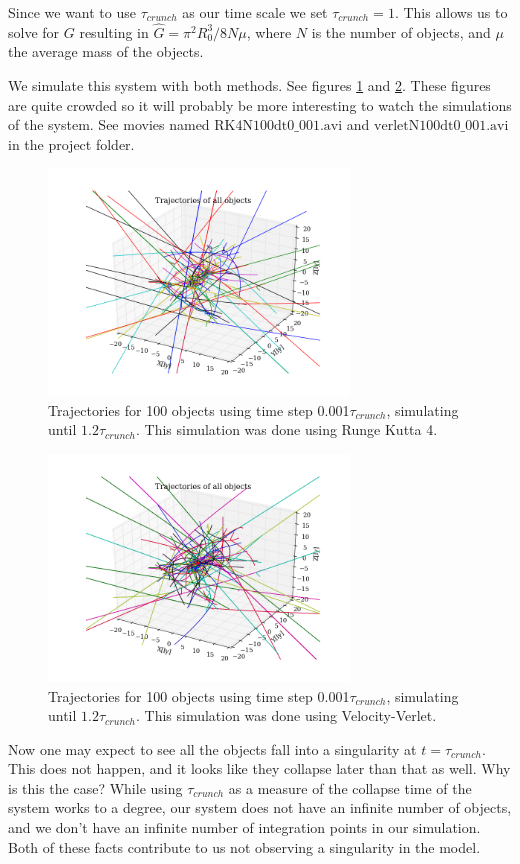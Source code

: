 \documentclass{aa}   %
\begin{document}
Since we want to use $\tau_{crunch}$ as our time scale we set $\tau_{crunch} = 1$. This allows us to solve for $G$ resulting in 
$\hat G = \pi^2 R_0^3/8N\mu$, where $N$ is the number of objects, and $\mu$ the average mass of the objects. 

We simulate this system with both methods. See figures \ref{RK4N100dt0_001} and \ref{verletN100dt0_001}. These figures are quite crowded so it will probably be more interesting to watch the simulations of the system. See movies named 
$\mathrm{RK4N100dt0\_001.avi}$ and $\mathrm{verletN100dt0\_001.avi}$ in the project folder.
\begin{figure}[hbtp]
 \centering
 \includegraphics[width=80mm]{RK4N100dt0_001.png}
 \caption[]{\label{RK4N100dt0_001}
   Trajectories for 100 objects using time step 0.001$\tau_{crunch}$, simulating until $1.2\tau_{crunch}$. This simulation was done using Runge Kutta 4.
 }
\end{figure}
\begin{figure}[hbtp]
 \centering
 \includegraphics[width=80mm]{verletN100dt0_001.png}
 \caption[]{\label{verletN100dt0_001}
   Trajectories for 100 objects using time step 0.001$\tau_{crunch}$, simulating until $1.2\tau_{crunch}$. This simulation was done using Velocity-Verlet.
 }
\end{figure}

Now one may expect to see all the objects fall into a singularity at $t = \tau_{crunch}$. This does not happen, and it looks like they collapse later than that as well. Why is this the case? While using $\tau_{crunch}$ as a measure of the collapse time of the system works to a degree, our system does not have an infinite number of objects, and we don't have an infinite number of integration points in our simulation. Both of these facts contribute to us not observing a singularity in the model.
\end{document}
